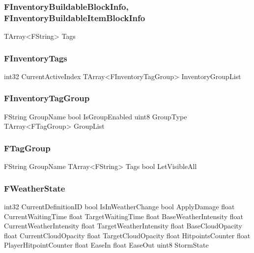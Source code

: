 \subsubsection{FInventoryBuildableBlockInfo, FInventoryBuildableItemBlockInfo}
\begin{code}
TArray<FString>                             Tags
\end{code}




\subsubsection{FInventoryTags}
\begin{code}
int32                                       CurrentActiveIndex
TArray<FInventoryTagGroup>                  InventoryGroupList
\end{code}

\subsubsection{FInventoryTagGroup}
\begin{code}
FString                                     GroupName
bool                                        IsGroupEnabled
uint8                                       GroupType
TArray<FTagGroup>                           GroupList
\end{code}

\subsubsection{FTagGroup}
\begin{code}
FString                                     GroupName
TArray<FString>                             Tags
bool                                        LetVisibleAll
\end{code}

\subsubsection{FWeatherState}
\begin{code}
int32                                       CurrentDefinitionID
bool                                        IsInWeatherChange
bool                                        ApplyDamage
float                                       CurrentWaitingTime
float                                       TargetWaitingTime
float                                       BaseWeatherIntensity
float                                       CurrentWeatherIntensity
float                                       TargetWeatherIntensity
float                                       BaseCloudOpacity
float                                       CurrentCloudOpacity
float                                       TargetCloudOpacity
float                                       HitpointsCounter
float                                       PlayerHitpointCounter
float                                       EaseIn
float                                       EaseOut
uint8                                       StormState
\end{code}